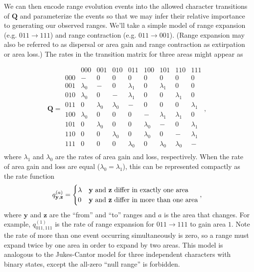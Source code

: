 \documentclass[11pt]{article}
\begin{document}
We can then encode range evolution events into the allowed character transitions of $\textbf{Q}$ and parameterize the events so that we may infer their relative importance to generating our observed ranges.
We'll take a simple model of range expansion (e.g. $011 \rightarrow 111$) and range contraction (e.g. $011 \rightarrow 001$).
(Range expansion may also be referred to as dispersal or area gain and range contraction as extirpation or area loss.)
The rates in the transition matrix for three areas might appear as

\[
\textbf{Q} = 
	\begin{array}{r|cccccccc}
		& 000 & 001 & 010 & 011 & 100 & 101 & 110 & 111 \\
		\hline
		000 & - & 0 & 0 & 0 & 0 & 0 & 0 & 0 \\
		001 & \lambda_0 & - & 0 & \lambda_1 & 0 & \lambda_1 & 0 & 0 \\
		010 & \lambda_0 & 0 & - & \lambda_1 & 0 & 0 & \lambda_1 & 0 \\
		011 & 0 & \lambda_0 & \lambda_0 & - & 0 & 0 & 0 & \lambda_1 \\
		100 & \lambda_0 & 0 & 0 & 0 & - & \lambda_1 & \lambda_1 & 0 \\
		101 & 0 & \lambda_0 & 0 & 0 & \lambda_0 & - & 0 & \lambda_1 \\
		110 & 0 & 0 & \lambda_0 & 0 & \lambda_0 & 0 & - & \lambda_1 \\
		111 & 0 & 0 & 0 & \lambda_0 & 0 & \lambda_0 & \lambda_0 & - \\								
	\end{array},
\]
where $\lambda_1$ and $\lambda_0$ are the rates of area gain and loss, respectively.
When the rate of area gain and loss are equal ($\lambda_0=\lambda_1$), this can be represented compactly as the rate function
\[
q^{(a)}_{\textbf{y},\textbf{z}} =
\begin{cases}
\lambda & \text{\textbf{y} and \textbf{z} differ in exactly one area}  \\
0 & \text{\textbf{y} and \textbf{z} differ in more than one area}
\end{cases},
\]
where $\textbf{y}$ and $\textbf{z}$ are the ``from'' and ``to'' ranges and $a$ is the area that changes.
For example, $q^{(1)}_{011,111}$ is the rate of range expansion for $011 \rightarrow 111$ to gain area $1$.
Note the rate of more than one event occurring simultaneously is zero, so a range must expand twice by one area in order to expand by two areas.
This model is analogous to the Jukes-Cantor model for three independent characters with binary states, except the all-zero ``null range'' is forbidden.
\end{document}
